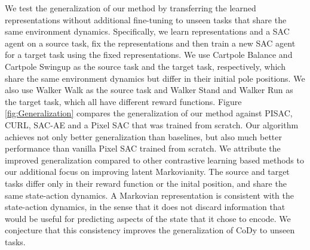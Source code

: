 \documentclass[a4paper,12pt]{article}
\begin{document}
We test the generalization of our method by transferring the learned representations without additional fine-tuning to unseen tasks that share the same environment dynamics. Specifically, we learn representations and a SAC agent on a source task, fix the representations and then train a new SAC agent for a target task using the fixed representations. We use Cartpole Balance and Cartpole Swingup as the source task and the target task, respectively, which share the same environment dynamics but differ in their initial pole positions. We also use Walker Walk as the source task and Walker Stand and Walker Run as the target task, which all have different reward functions. Figure \ref{fig:Generalization} compares the generalization of our method against PISAC, CURL, SAC-AE and a Pixel SAC that was trained from scratch. Our algorithm achieves not only better generalization than baselines, but also much better performance than vanilla Pixel SAC trained from scratch.
We attribute the improved generalization compared to other contrastive learning based methods to our additional focus on improving latent Markovianity. The source and target tasks differ only in their reward function or the inital position, and share the same state-action dynamics. A Markovian representation is consistent with the state-action dynamics, in the sense that it does not discard information that would be useful for predicting aspects of the state that it chose to encode. We conjecture that this consistency improves the generalization of CoDy to unseen tasks.   

\end{document}
